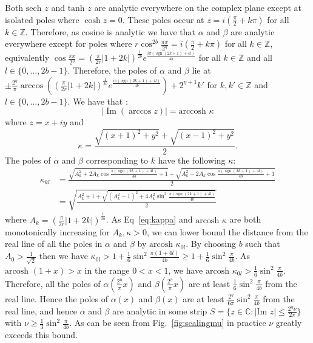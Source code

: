 \documentclass[aps,floatfix,10pt,amssymb,amsfont,amsmath,superscriptaddress,float,nofootinbib,longbibliography,nobalancelastpage,twocolumn]{revtex4-2}
\begin{document}
Both $\text{sech } z$ and $\text{tanh } z$ are analytic everywhere on the complex plane except at isolated poles where $\cosh z = 0$. These poles occur at $z = i(\frac{\pi}{2} + k \pi)$ for all $k \in \mathbb{Z}$. Therefore, as cosine is analytic we have that $\alpha$ and $\beta$ are analytic everywhere except for poles where $r \cos^{2b}\frac{\pi x}{2^{\eta}} = i(\frac{\pi}{2} + k \pi)$ for all $k \in \mathbb{Z}$, equivalently $\cos \frac{\pi x}{2^{\eta}} = (\frac{\pi}{2r}|1+2k|)^{\frac{1}{2b}} e^{\frac{i\pi(\operatorname{sgn}(2k+1)+4l)}{4b}}$  for all $k \in \mathbb{Z}$ and all $l \in \{0,\ldots,2b-1\}$. Therefore, the poles of $\alpha$ and $\beta$ lie at $\pm\frac{2^{\eta}}{\pi}\arccos ((\frac{\pi}{2r}|1+2k|)^{\frac{1}{2b}}e^{\frac{i\pi(\operatorname{sgn}(2k+1)+4l)}{4b}}) + 2^{\eta+1} k'$ for $k, k' \in \mathbb{Z}$ and $l \in \{0,\ldots,2b-1\}$. We have that \cite[\href{http://dlmf.nist.gov/4.23.E35}{4.23.35}]{NIST:DLMF}:
\begin{equation}
    |\operatorname{Im}(\arccos z)| = \text{arccosh }{\kappa}
\end{equation}
where $z=x+iy$ and
\begin{equation}
    \kappa = \frac{\sqrt{(x+1)^2 + y^2} + \sqrt{(x-1)^2+y^2}}{2}.
\end{equation}
The poles of $\alpha$ and $\beta$ corresponding to $k$ have the following $\kappa$:
\begin{align}
    \kappa_{kl} &= \frac{\sqrt{A_k^2 + 2A_k\cos \frac{\pi(\operatorname{sgn}(2k+1)+4l)}{4b}+1} +\sqrt{A_k^2 - 2A_k\cos \frac{\pi(\operatorname{sgn}(2k+1)+4l)}{4b}+1}}{2}\\
    &= \sqrt{\frac{A_k^2+1 + \sqrt{(A_k^2-1)^2+4A_k^2\sin^2\frac{\pi(\operatorname{sgn}(2k+1)+4l)}{4b}}}{2}}
    \label{eq:kappa}
\end{align}
where $A_k = (\frac{\pi}{2r}|1+2k|)^{\frac{1}{2b}}$.  As Eq~\eqref{eq:kappa} and $\text{arcosh } \kappa$ are both monotonically increasing for $A_k, \kappa>0$, we can lower bound the distance from the real line of all the poles in $\alpha$ and $\beta$ by $\text{arcosh } \kappa_{0l}$. By choosing $b$ such that $A_0 > \frac{1}{\sqrt{2}}$ then we have $\kappa_{0l} > 1 + \frac{1}{6}\sin^2\frac{\pi(1+4l)}{4b} \geq 1 + \frac{1}{6}\sin^2\frac{\pi}{4b}$. As $\text{arcosh } (1+x) > x$ in the range $0<x<1$, we have $\text{arcosh } \kappa_{0l} > \frac{1}{6}\sin^2\frac{\pi}{4b}$. Therefore, all the poles of $\alpha(\frac{2^{\eta}}{\pi}x)$ and $\beta(\frac{2^{\eta}}{\pi}x)$ are at least $\frac{1}{6}\sin^2\frac{\pi}{4b}$ from the real line. Hence the poles of $\alpha(x)$ and $\beta(x)$ are at least $\frac{2^{\eta}}{6\pi}\sin^2\frac{\pi}{4b}$ from the real line, and hence $\alpha$ and $\beta$ are analytic in some strip $S =\{z \in \mathbb{C}: |\text{Im } z| \leq \frac{2^{\eta}\nu}{2\pi}\}$ with $\nu \geq \frac{1}{3}\sin^2\frac{\pi}{4b}$. As can be seen from Fig.~\ref{fig:scalingmu} in practice $\nu$ greatly exceeds this bound.
\end{document}
